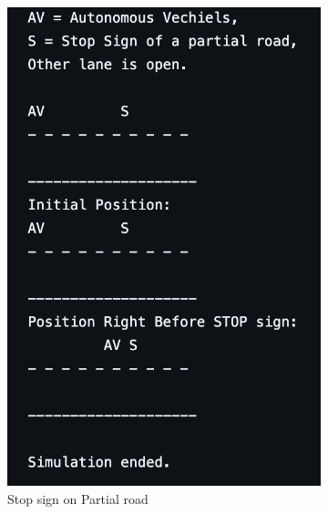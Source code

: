 \documentclass[conference]{IEEEtran}
\begin{document}
\begin{figure}[h] %
    \centering
    \begin{subfigure}[b]{0.3\textwidth}
        \includegraphics[width=.9\linewidth]{Fig/PL_Stop_S1.png}
        \caption{Stop sign on Partial road}
    \end{subfigure}
    \hfill
    \begin{subfigure}[b]{0.3\textwidth}

\end{subfigure}
\end{figure}
\end{document}
